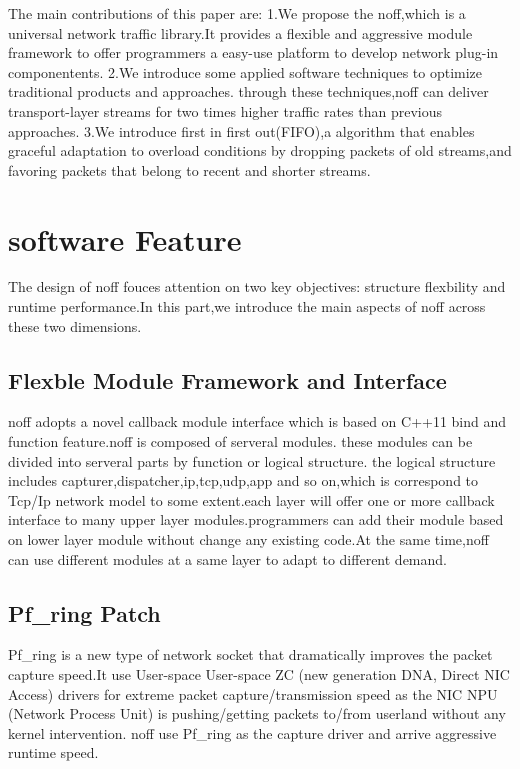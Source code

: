 \documentclass[conference]{IEEEtran}
\begin{document}
The main contributions of this paper are:
\newline 1.We propose the noff,which is a universal network traffic library.It provides a flexible and aggressive module framework to offer programmers a easy-use platform
to develop network plug-in componentents.
\newline 2.We introduce some applied software techniques to optimize traditional products and approaches.
through these techniques,noff can deliver transport-layer streams for two times higher traffic rates
than previous approaches.
\newline 3.We introduce first in first out(FIFO),a algorithm that enables graceful adaptation to overload
conditions by dropping packets of old streams,and favoring packets that belong to recent and shorter streams.

\section{software Feature}
The design of noff fouces attention on two key objectives: structure flexbility and runtime performance.In this part,we introduce the main aspects of noff across these two dimensions.


\subsection{Flexble Module Framework and Interface}

noff adopts a novel callback module interface which is based on C++11 bind and function feature.noff is composed of serveral modules.
these modules can be divided into serveral parts by function or logical structure. the logical structure includes
capturer,dispatcher,ip,tcp,udp,app and so on,which is correspond to Tcp/Ip network model to some extent.each layer will offer one
or more callback interface to many upper layer modules.programmers can add their module based on lower layer module without change any
existing code.At the same time,noff can use different modules at a same layer to adapt to different demand.

\subsection{Pf\_ring Patch}
Pf\_ring is a new type of network socket that dramatically improves the packet capture speed.It use User-space
User-space ZC (new generation DNA, Direct NIC Access) drivers for extreme packet capture/transmission speed as the 
NIC NPU (Network Process Unit) is pushing/getting packets to/from userland without any kernel intervention. 
noff use Pf\_ring as the capture driver and arrive aggressive runtime speed.
\end{document}
